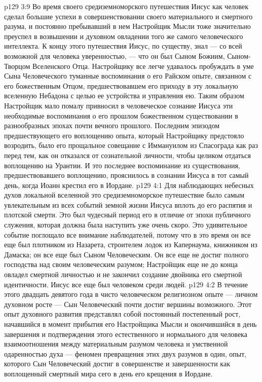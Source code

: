 \vs p129 3:9 Во время своего средиземноморского путешествия Иисус как человек сделал большие успехи в совершенствовании своего материального и смертного разума, и постоянно пребывавший в нем Настройщик Мысли тоже значительно преуспел в возвышении и духовном овладении того же самого человеческого интеллекта. К концу этого путешествия Иисус, по существу, знал --- со всей возможной для человека уверенностью, --- что он был Сыном Божиим, Сыном\hyp{}Творцом Вселенского Отца. Настройщику все легче удавалось пробуждать в уме Сына Человеческого туманные воспоминания о его Райском опыте, связанном с его божественным Отцом, предшествовавшем его приходу в эту локальную вселенную Небадона с целью ее устройства и управления ею. Таким образом Настройщик мало помалу привносил в человеческое сознание Иисуса эти необходимые воспоминания о его прошлом божественном существовании в разнообразных эпохах почти вечного прошлого. Последним эпизодом предшествующего его воплощению опыта, который Настройщику предстояло возродить, было его прощальное совещание с Иммануилом из Спасограда как раз перед тем, как он отказался от сознательной личности, чтобы целиком отдаться воплощению на Урантии. И это последнее воспоминание из существования, предшествовавшего воплощению, прояснилось в сознании Иисуса в тот самый день, когда Иоанн крестил его в Иордане.
\vs p129 4:1 Для наблюдающих небесных духов локальной вселенной это средиземноморское путешествие было самым увлекательным из всех событий земной жизни Иисуса вплоть до его распятия и плотской смерти. Это был чудесный период его  в отличие от эпохи публичного служения, которая должна была наступить уже очень скоро. Это удивительное событие поглощало все внимание наблюдателей, потому что в это время он все еще был плотником из Назарета, строителем лодок из Капернаума, книжником из Дамаска; он все еще был Сыном Человеческим. Он все еще не достиг полного господства над своим человеческим разумом; Настройщик еще не до конца овладел смертной личностью и не закончил создание двойника его смертной идентичности. Иисус все еще был человеком среди людей.
\vs p129 4:2 В течение этого двадцать девятого года в чисто человеческом религиозном опыте --- личном духовном росте --- Сын Человеческий почти достиг вершины возможного. Этот опыт духовного развития представлял собой постоянный постепенный рост, начавшийся в момент прибытия его Настройщика Мысли и окончившийся в день завершения и подтверждения этого естественного и нормального для человека взаимоотношения между материальным разумом человека и умственной одаренностью духа --- феномен превращения этих двух разумов в один, опыт, которого Сын Человеческий достиг в совершенстве и завершенности как воплощенный смертный мира сего в день его крещения в Иордане.

